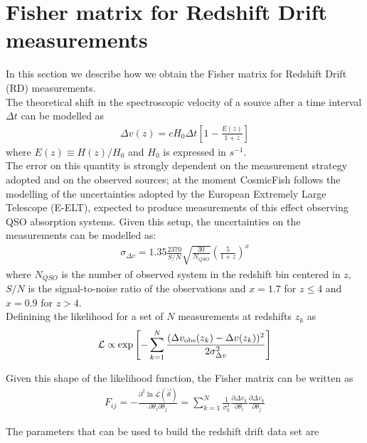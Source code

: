 \documentclass[prd,nofootinbib,showpacs]{revtex4}
\begin{document}
%
\section{Fisher matrix for Redshift Drift measurements}
%
In this section we describe how we obtain the Fisher matrix for Redshift Drift (RD) measurements.\\
The theoretical shift in the spectroscopic velocity of a source after a time interval $\Delta t$ can be modelled as
\begin{align}
\Delta v(z) = cH_0\Delta t\left[1-\frac{E(z)}{1+z}\right]
\end{align}
where $E(z)\equiv H(z)/H_0$ and $H_0$ is expressed in $s^{-1}$.\\
The error on this quantity is strongly 
dependent on the measurement strategy adopted and on the observed sources; at the moment CosmicFish follows the 
modelling of the uncertainties adopted by the European Extremely Large Telescope (E-ELT), expected to produce
measurements of this effect observing QSO absorption systems. Given this setup, the uncertainties on the 
measurements can be modelled as:
\begin{align}
\sigma_{\Delta v} = 1.35\frac{2370}{S/N}\sqrt{\frac{30}{N_{QSO}}}\left(\frac{5}{1+z}\right)^x
\end{align}
where $N_{QSO}$ is the number of observed system in the redshift bin centered in $z$, $S/N$ is the signal-to-noise ratio of the observations and $x=1.7$ for $z\leq4$ and $x=0.9$ for $z>4$.\\


Definining the likelihood for a set of $N$ measurements at redshifts $z_k$ as 
\begin{align}
 \mathcal{L} \propto \exp{\left[-\sum_{k=1}^N{\frac{(\Delta v_{\rm obs}(z_k) - \Delta v(z_k))^2}{2\sigma^2_{\Delta v}}}\right]}
\end{align}

Given this shape of the likelihood function, the Fisher matrix can be written as
\begin{align}
 F_{ij} = -\frac{\partial^2\ln{\mathcal{L}(\vec{\theta})}}{\partial\theta_i\partial\theta_j}=\sum_{k=1}^N{\frac{1}{\sigma^2_k}\frac{\partial \Delta v_k}{\partial\theta_i}\frac{\partial \Delta v_k}{\partial\theta_j}}
\end{align}

The parameters that can be used to build the redshift drift data set are
\end{document}

